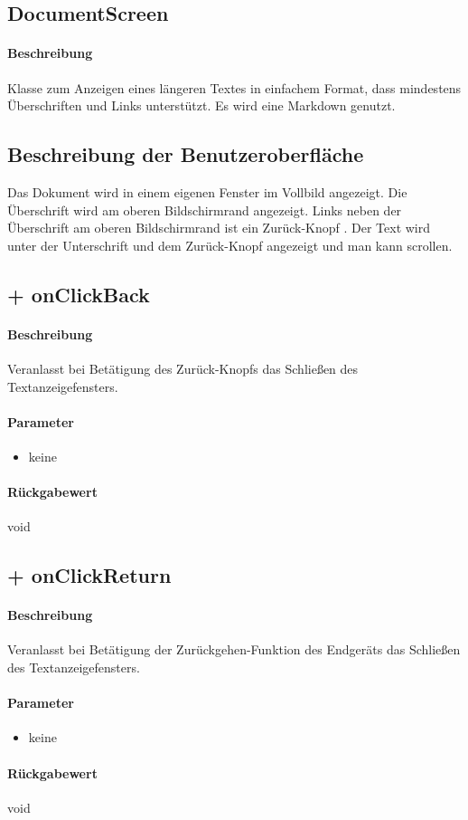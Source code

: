 \subsection{DocumentScreen}
\paragraph*{Beschreibung}
Klasse zum Anzeigen eines längeren Textes in einfachem Format, 
dass mindestens Überschriften und Links unterstützt.
Es wird eine Markdown genutzt.

\subsection{Beschreibung der Benutzeroberfläche}
Das Dokument wird in einem eigenen Fenster im Vollbild angezeigt.
Die Überschrift wird am oberen Bildschirmrand angezeigt.
Links neben der Überschrift am oberen Bildschirmrand ist ein \dq Zurück-Knopf \dq{}.
Der Text wird unter der Unterschrift und dem \dq Zurück-Knopf \dq{} angezeigt und man kann scrollen.

\subsection{+ onClickBack}%
\paragraph*{Beschreibung}
Veranlasst bei Betätigung des \dq Zurück-Knopfs \dq{} das Schließen des Textanzeigefensters.
\paragraph*{Parameter}
\begin{itemize}
    \item keine
\end{itemize}
\paragraph*{Rückgabewert}
void

\subsection{+ onClickReturn}%
\paragraph*{Beschreibung}
Veranlasst bei Betätigung der Zurückgehen-Funktion des Endgeräts das Schließen des Textanzeigefensters.
\paragraph*{Parameter}
\begin{itemize}
    \item keine
\end{itemize}
\paragraph*{Rückgabewert}
void